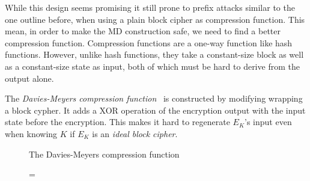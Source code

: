 While this design seems promising it still prone to prefix attacks similar to the one outline before, when using a plain block cipher as compression function.
This mean, in order to make the MD construction safe, we need to find a better compression function.
Compression functions are a one-way function like hash functions. However, unlike hash functions, they take a constant-size block as well as a constant-size state as input, both of which must be hard to derive from the output alone.

The \emph{Davies-Meyers compression function}~\cite{winternitz1984secure,black2002black} is constructed by modifying wrapping a block cypher.
It adds a XOR operation of the encryption output with the input state before the encryption.
This makes it hard to regenerate $E_K$'s input even when knowing $K$ if $E_K$ is an \emph{ideal block cipher}.

\begin{wrapfigure}{r}{2.9in}

\caption{The Davies-Meyers compression function}
\end{wrapfigure}

\begin{wrapfigure}{l}{3in}

\bnm
{} = 
\enm

\end{wrapfigure}

